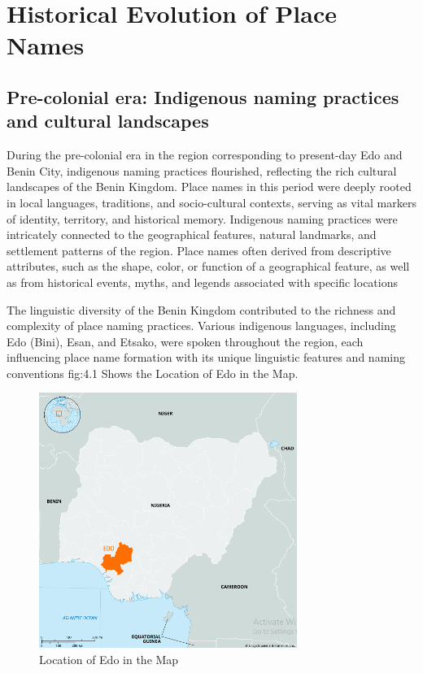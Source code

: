 \chapter{Historical Evolution of Place Names}
\section*{Pre-colonial era: Indigenous naming practices and cultural landscapes}
During the pre-colonial era in the region corresponding to present-day Edo and Benin City, indigenous naming practices flourished, reflecting the rich cultural landscapes of the Benin Kingdom. Place names in this period were deeply rooted in local languages, traditions, and socio-cultural contexts, serving as vital markers of identity, territory, and historical memory\cite{Agheyisi}.
Indigenous naming practices were intricately connected to the geographical features, natural landmarks, and settlement patterns of the region. Place names often derived from descriptive attributes, such as the shape, color, or function of a geographical feature, as well as from historical events, myths, and legends associated with specific locations\cite{egharevba1968short}

The linguistic diversity of the Benin Kingdom contributed to the richness and complexity of place naming practices. Various indigenous languages, including Edo (Bini), Esan, and Etsako, were spoken throughout the region, each influencing place name formation with its unique linguistic features and naming conventions \cite{egharevba1968short} fig:4.1 Shows the Location of Edo in the Map. 

\begin{figure}
    \centering
    \includegraphics[width=0.9\linewidth]{Location of Edo in the Map.png}
    \caption{Location of Edo in the Map}
    \label{fig:loc of edo in map}
\end{figure}
\clearpage

